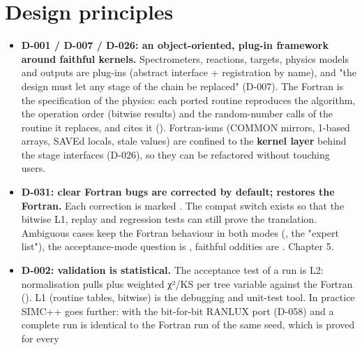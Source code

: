 \section{\texorpdfstring{Design principles}{Design principles}}\label{translation_report-01u5fmethodology:13-design-principles}
\begin{itemize}
\item \textbf{D-001 / D-007 / D-026: an object-oriented,\allowbreak{} plug-in framework around faithful kernels.} Spectrometers,\allowbreak{}
reactions, targets, physics models and outputs are plug-ins (abstract interface + registration by name), and
"the design must let any stage of the chain be replaced" (D-007). The Fortran is the specification of the physics:
each ported routine reproduces the algorithm, the operation order (bitwise results) and the random-number calls
of the routine it replaces, and cites it (). Fortran-isms (COMMON mirrors,
1-based arrays, SAVEd locals, stale values) are confined to the \textbf{kernel layer} behind the stage interfaces
(D-026), so they can be refactored without touching users.
\item \textbf{D-031: clear Fortran bugs are corrected by default;  restores the Fortran.} Each correction is
marked . The compat switch exists
so that the bitwise L1, replay and regression tests can still prove the translation. Ambiguous cases keep the
Fortran behaviour in both modes (, the "expert list"), the acceptance-mode question is
, faithful oddities are . Chapter 5.
\item \textbf{D-002: validation is statistical.} The acceptance test of a run is L2:  normalisation pulls plus
weighted χ²/KS per tree variable against the Fortran (). L1 (routine tables, bitwise) is the
debugging and unit-test tool. In practice SIMC++ goes further: with the bit-for-bit RANLUX port (D-058) and
 a complete run is identical to the Fortran run of the same seed, which is proved for every

\end{itemize}
